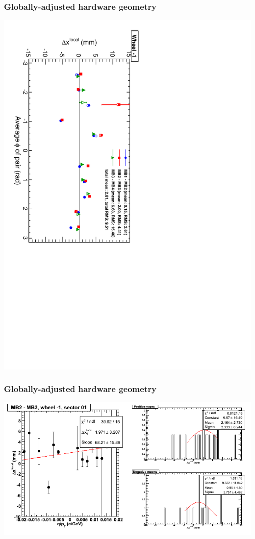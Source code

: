 \documentclass[compress]{beamer}
\begin{document}
\begin{frame}
\frametitle{Globally-adjusted hardware geometry}
\includegraphics[height=\linewidth, angle=90]{NOV4_segdiff_HW_x_whm1.pdf}
\end{frame}

\begin{frame}
\frametitle{Globally-adjusted hardware geometry}
\includegraphics[width=\linewidth]{NOV4_segdiffs_HW/dt13_resid_B_01_23.png}
\end{frame}
\end{document}
